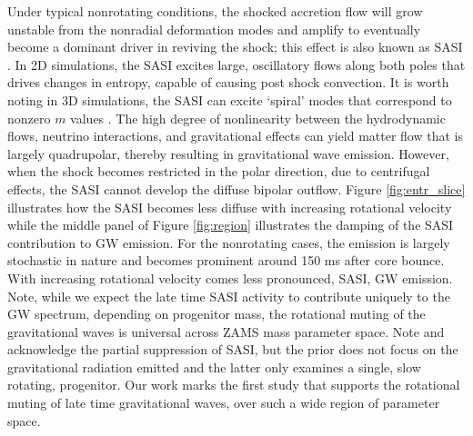 \documentclass[twocolumn,times]{aastex62}  %
\begin{document}
Under typical nonrotating conditions, the shocked accretion flow will grow unstable from the nonradial deformation modes and amplify to eventually become a dominant driver in reviving the shock; this effect is also known as SASI \citep{scheck:2008,marek:2009a}.  In 2D simulations, the SASI excites large, oscillatory flows along both poles that drives changes in entropy, capable of causing post shock convection.  It is worth noting in 3D simulations, the SASI can excite `spiral' modes that correspond to nonzero $m$ values \citep{kuroda:2016}.  The high degree of nonlinearity between the hydrodynamic flows, neutrino interactions, and gravitational effects can yield matter flow that is largely quadrupolar, thereby resulting in gravitational wave emission.  However, when the shock becomes restricted in the polar direction, due to centrifugal effects, the SASI cannot develop the diffuse bipolar outflow. Figure \ref{fig:entr_slice} illustrates how the SASI becomes less diffuse with increasing rotational velocity while the middle panel of Figure \ref{fig:region} illustrates the damping of the SASI contribution to GW emission.  For the nonrotating cases, the emission is largely stochastic in nature and becomes prominent around 150 ms after core bounce.  With increasing rotational velocity comes less pronounced, SASI, GW emission.  Note, while we expect the late time SASI activity to contribute uniquely to the GW spectrum, depending on progenitor mass, the rotational muting of the gravitational waves is universal across ZAMS mass parameter space.  Note \citet{burrows:2007}  and \citet{moro:2018} acknowledge the partial suppression of SASI, but the prior does not focus on the gravitational radiation emitted and the latter only examines a single, slow rotating, progenitor.  Our work marks the first study that supports the rotational muting of late time gravitational waves, over such a wide region of parameter space. 
 
\end{document}
